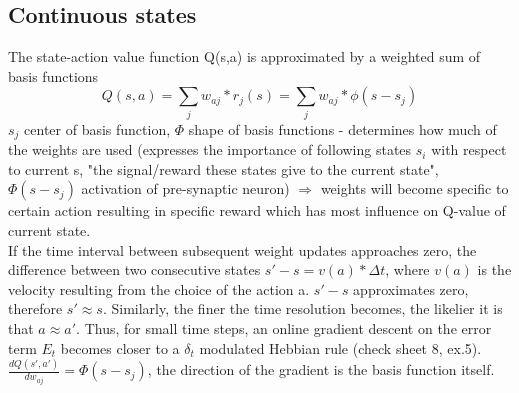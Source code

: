 \documentclass[11pt]{article}
\begin{document}
\subsection{Continuous states}
The state-action value function Q(s,a) is approximated by a weighted sum of basis functions
\[
	Q(s,a) = \sum_j w_{aj}*r_j(s) = \sum_j w_{aj}*\phi(s-s_j)
\]
$s_j$ center of basis function, $\Phi$ shape of basis functions - determines how much of the weights are used (expresses the importance of following states $s_i$ with respect to current s, "the signal/reward these states give to the current state", $\Phi(s-s_j)$ activation of pre-synaptic neuron) $\Rightarrow$ weights will become specific to certain action resulting in specific reward which has most influence on Q-value of current state.\\
If the time interval between subsequent weight updates approaches zero, the difference between two consecutive states $s' - s = v(a) * \Delta t$, where $v(a)$ is the velocity resulting from the choice of the action a. $s'-s$ approximates zero, therefore $s' \approx s$. Similarly, the finer the time resolution becomes, the likelier it is that $a \approx a'$. Thus, for small time steps, an online gradient descent on the error term $E_t$ becomes closer to a $\delta_t$ modulated Hebbian rule (check sheet 8, ex.5). 
$\frac{dQ(s',a')}{dw_{aj}}=\Phi(s-s_j)$, the direction of the gradient is the basis function itself.
\end{document}
